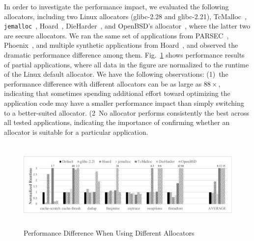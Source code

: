 In order to investigate the performance impact, we evaluated the following allocators, including two Linux allocators (glibc-2.28 and glibc-2.21), TcMalloc~\citep{tcmalloc}, \texttt{jemalloc}~\citep{jemalloc}, Hoard~\citep{Hoard}, DieHarder~\citep{DieHarder}, and OpenBSD's allocator~\citep{openbsd}, where the latter two are secure allocators. We ran the same set of applications from PARSEC~\citep{parsec}, Phoenix~\citep{phoenix}, and multiple synthetic applications from Hoard~\cite{Hoard}, and observed the dramatic performance difference among them. Fig.~\ref{fig:motivation} shows performance results of partial applications, where all data in the figure are normalized to the runtime of the Linux default allocator. We have the following observations: (1)~the performance difference with different allocators can be as large as $88\times$, indicating that sometimes spending additional effort toward optimizing the application code may have a smaller performance impact than simply switching to a better-suited allocator. (2~No allocator performs consistently the best across all tested applications, indicating the importance of confirming whether an allocator is suitable for a particular application. 



\begin{figure}[!ht]
\centering
\includegraphics[width=\columnwidth,height=125pt]{figures/regular-performance}
\caption{Performance Difference When Using Different Allocators\label{fig:motivation}}
\end{figure}


